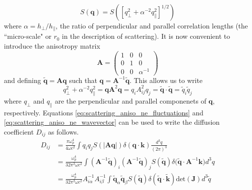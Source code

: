 \begin{equation}
\label{eq:scattering_aniso_ne_fluctuations}
S(\mathbf{q}) = S([q_\perp^2 + \alpha^{-2}q_\parallel^2]^{1/2})
\end{equation}
where $\alpha = h_\perp/h_\parallel$, the ratio of perpendicular and parallel correlation lengths (the ``micro-scale" or $r_0$ in the \cite{Chandrasekhar1952} description of scattering). It is now convenient to introduce the anisotropy matrix 
\begin{equation}
\label{eq:scattering_anisomatrix}
\mathbf{A}=
\begin{pmatrix}
1 & 0 & 0 \\
0 & 1 & 0 \\
0 & 0 & \alpha^{-1}
\end{pmatrix}
\end{equation}
and defining $\widetilde{\mathbf{q}} = \mathbf{A} \mathbf{q}$ such that $\mathbf{q} = \mathbf{A}^{-1} \widetilde{\mathbf{q}}$. This allows us to write
\begin{equation}
\label{eq:scattering_aniso_ne_wavevector}
q_\perp^2 + \alpha^{-2} q_\parallel^2 =  \mathbf{q}\mathbf{A}^2\mathbf{q} = q_i A_{ij}^2 q_j = \widetilde{\mathbf{q}} \cdot \widetilde{\mathbf{q}} = \widetilde{q}_i \widetilde{q}_j
\end{equation}
where $q_\perp$ and $q_\parallel$ are the perpendicular and parallel componenets of $\mathbf{q}$, respectively. Equations \ref{eq:scattering_aniso_ne_fluctuations} and \ref{eq:scattering_aniso_ne_wavevector} can be used to write the diffusion coefficient $D_{ij}$ as follows.
\begin{equation}
\label{eq:scattering_aniso_diffusion}
\begin{aligned}
D_{ij} & = \frac{\pi \omega_p^4}{4 \omega c^2} \int q_i q_j S(\vert \mathbf{Aq} \vert) \delta(\mathbf{q} \cdot \mathbf{k}) \frac{d^3 q}{(2 \pi)^3} \\
& = \frac{\omega_p^4}{32 \pi^2 \omega c^2} \int (\mathbf{A}^{-1} \widetilde{\mathbf{q}})_i  (\mathbf{A}^{-1} \widetilde{\mathbf{q}})_j S(\widetilde{\mathbf{q}}) \delta(\widetilde{\mathbf{q}} \cdot \mathbf{A}^{-1} \mathbf{k)} d^3q \\
& = \frac{\omega_p^4}{32 \pi^2 \omega c^2} A_{i\alpha}^{-1} A_{i \beta}^{-1} \int \widetilde{\mathbf{q}}_\alpha \widetilde{\mathbf{q}}_\beta S(\widetilde{\mathbf{q}}) \delta(\widetilde{\mathbf{q}} \cdot \widetilde{\mathbf{k}}) \mbox{det}(\mathbf{J}) d^3 \widetilde{q}
\end{aligned}
\end{equation}
